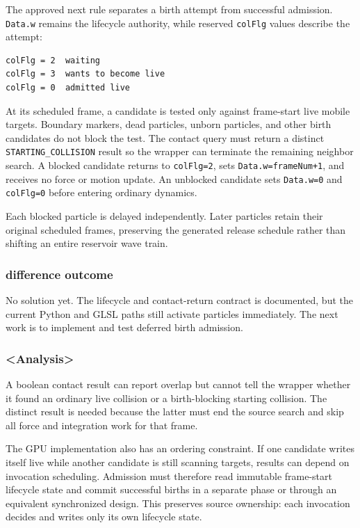 The approved next rule separates a birth attempt from successful admission.
\texttt{Data.w} remains the lifecycle authority, while reserved
\texttt{colFlg} values describe the attempt:

\begin{verbatim}
colFlg = 2  waiting
colFlg = 3  wants to become live
colFlg = 0  admitted live
\end{verbatim}

At its scheduled frame, a candidate is tested only against frame-start live
mobile targets.  Boundary markers, dead particles, unborn particles, and other
birth candidates do not block the test.  The contact query must return a
distinct \texttt{STARTING\_COLLISION} result so the wrapper can terminate the
remaining neighbor search.  A blocked candidate returns to \texttt{colFlg=2},
sets \texttt{Data.w=frameNum+1}, and receives no force or motion update.  An
unblocked candidate sets \texttt{Data.w=0} and \texttt{colFlg=0} before
entering ordinary dynamics.

Each blocked particle is delayed independently.  Later particles retain their
original scheduled frames, preserving the generated release schedule rather
than shifting an entire reservoir wave train.

\subsubsection{difference outcome}

No solution yet.  The lifecycle and contact-return contract is documented, but
the current Python and GLSL paths still activate particles immediately.  The
next work is to implement and test deferred birth admission.

\subsubsection{<Analysis>}

A boolean contact result can report overlap but cannot tell the wrapper whether
it found an ordinary live collision or a birth-blocking starting collision.
The distinct result is needed because the latter must end the source search and
skip all force and integration work for that frame.

The GPU implementation also has an ordering constraint.  If one candidate
writes itself live while another candidate is still scanning targets, results
can depend on invocation scheduling.  Admission must therefore read immutable
frame-start lifecycle state and commit successful births in a separate phase or
through an equivalent synchronized design.  This preserves source ownership:
each invocation decides and writes only its own lifecycle state.

